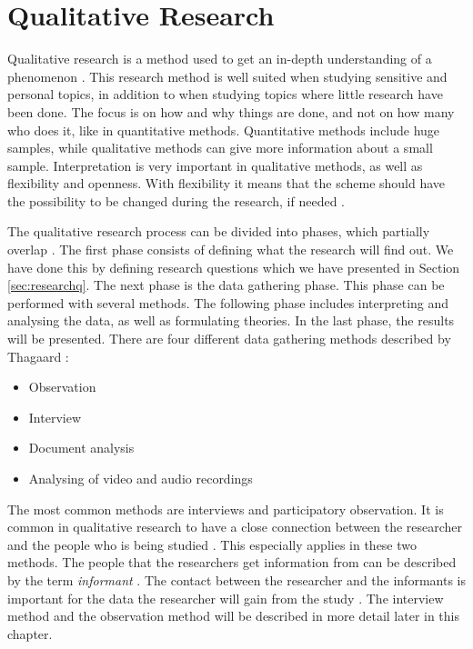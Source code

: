 \section{Qualitative Research}
\label{sec:qualitativeres}
Qualitative research is a method used to get an in-depth understanding of a phenomenon \cite{qualitative}. This research method is well suited when studying sensitive and personal topics, in addition to when studying topics where little research have been done. The focus is on how and why things are done, and not on how many who does it, like in quantitative methods. Quantitative methods include huge samples, while qualitative methods can give more information about a small sample. Interpretation is very important in qualitative methods, as well as flexibility and openness. With flexibility it means that the scheme should have the possibility to be changed during the research, if needed \cite{qualitative}. 

The qualitative research process can be divided into phases, which partially overlap \cite{qualitative}. The first phase consists of defining what the research will find out. We have done this by defining research questions which we have presented in Section \ref{sec:researchq}. The next phase is the data gathering phase. This phase can be performed with several methods. The following phase includes interpreting and analysing the data, as well as formulating theories. In the last phase, the results will be presented. There are four different data gathering methods described by Thagaard \cite{qualitative}:

\begin{itemize}
\item Observation 
\item Interview  
\item Document analysis
\item Analysing of video and audio recordings
\end{itemize}

The most common methods are interviews and participatory observation. It is common in qualitative research to have a close connection between the researcher and the people who is being studied \cite{tjora}. This especially applies in these two methods. The people that the researchers get information from can be described by the term \emph{informant} \cite{qualitative}. The contact between the researcher and the informants is important for the data the researcher will gain from the study \cite{qualitative}. The interview method and the observation method will be described in more detail later in this chapter.

